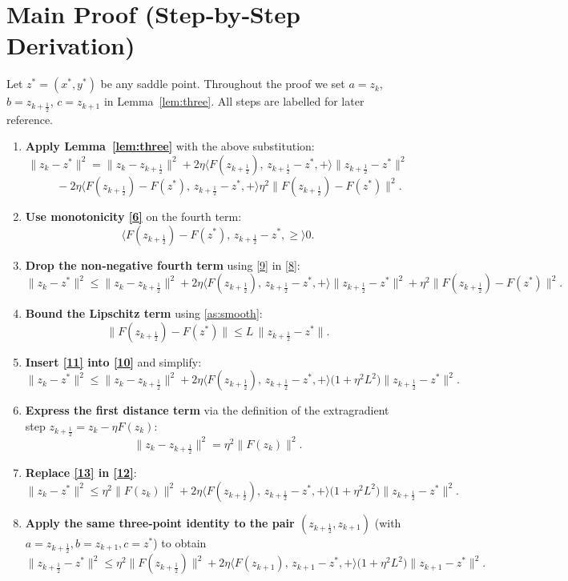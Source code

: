\documentclass{article}
\newcommand{\ip}[2]{\langle #1,#2\rangle}
\begin{document}
\section*{Main Proof (Step‑by‑Step Derivation)}
Let $z^*=(x^*,y^*)$ be any saddle point.  Throughout the proof we set
$a=z_k$, $b=z_{k+\frac12}$, $c=z_{k+1}$ in Lemma~\ref{lem:three}.
All steps are labelled for later reference.

\begin{enumerate}[label=[Step \arabic*], leftmargin=*, itemsep=2mm]
\item \textbf{Apply Lemma~\ref{lem:three}} with the above substitution:
\[
\|z_k-z^*\|^{2}
=
\|z_k-z_{k+\frac12}\|^{2}
+2\eta\ip{F(z_{k+\frac12}),\,z_{k+\frac12}-z^*}
+\|z_{k+\frac12}-z^*\|^{2}
\]
\[
\qquad
-2\eta\ip{F(z_{k+\frac12})-F(z^*),\,z_{k+\frac12}-z^*}
+\eta^{2}\|F(z_{k+\frac12})-F(z^*)\|^{2}.
\tag{8}
\]

\item \textbf{Use monotonicity \eqref{6}} on the fourth term:
\[
\ip{F(z_{k+\frac12})-F(z^*),\,z_{k+\frac12}-z^*}\ge 0 .
\tag{9}
\]

\item \textbf{Drop the non‑negative fourth term} using \eqref{9} in \eqref{8}:
\[
\|z_k-z^*\|^{2}
\le
\|z_k-z_{k+\frac12}\|^{2}
+2\eta\ip{F(z_{k+\frac12}),\,z_{k+\frac12}-z^*}
+\|z_{k+\frac12}-z^*\|^{2}
+\eta^{2}\|F(z_{k+\frac12})-F(z^*)\|^{2}.
\tag{10}
\]

\item \textbf{Bound the Lipschitz term} using \eqref{as:smooth}:
\[
\|F(z_{k+\frac12})-F(z^*)\|
\le L\,\|z_{k+\frac12}-z^*\|.
\tag{11}
\]

\item \textbf{Insert \eqref{11} into \eqref{10}} and simplify:
\[
\|z_k-z^*\|^{2}
\le
\|z_k-z_{k+\frac12}\|^{2}
+2\eta\ip{F(z_{k+\frac12}),\,z_{k+\frac12}-z^*}
+\bigl(1+\eta^{2}L^{2}\bigr)\|z_{k+\frac12}-z^*\|^{2}.
\tag{12}
\]

\item \textbf{Express the first distance term} via the definition of the
extragradient step $z_{k+\frac12}=z_k-\eta F(z_k)$:
\[
\|z_k-z_{k+\frac12}\|^{2}
= \eta^{2}\|F(z_k)\|^{2}.
\tag{13}
\]

\item \textbf{Replace \eqref{13} in \eqref{12}}:
\[
\|z_k-z^*\|^{2}
\le
\eta^{2}\|F(z_k)\|^{2}
+2\eta\ip{F(z_{k+\frac12}),\,z_{k+\frac12}-z^*}
+\bigl(1+\eta^{2}L^{2}\bigr)\|z_{k+\frac12}-z^*\|^{2}.
\tag{14}
\]

\item \textbf{Apply the same three‑point identity to the pair
$(z_{k+\frac12},z_{k+1})$} (with $a=z_{k+\frac12}, b=z_{k+1}, c=z^*$) to obtain
\[
\|z_{k+\frac12}-z^*\|^{2}
\le
\eta^{2}\|F(z_{k+\frac12})\|^{2}
+2\eta\ip{F(z_{k+1}),\,z_{k+1}-z^*}
+\bigl(1+\eta^{2}L^{2}\bigr)\|z_{k+1}-z^*\|^{2}.
\tag{15}
\]


\end{enumerate}
\end{document}
